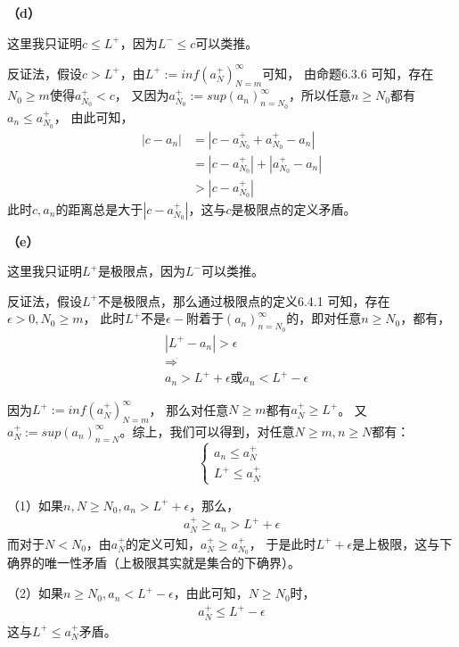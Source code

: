 \documentclass{article}
\theoremstyle{mystyle}
\begin{document}
\textbf{（d）}

这里我只证明$c \leq L^+$，因为$L^- \leq c$可以类推。

反证法，假设$c > L^+$，由$L^+ := inf(a_N^+)_{N=m}^\infty$可知，
由命题6.3.6 可知，存在$N_0 \geq m$使得$a_{N_0}^+ < c$，
又因为$a_{N_0}^+ := sup(a_n)_{n=N_0}^\infty$，所以任意$n \geq N_0$都有$a_n \leq a_{N_0}^+$，
由此可知，
\begin{align*}
  |c - a_n| & = |c - a_{N_0}^+ + a_{N_0}^+ - a_n|   \\
            & = |c - a_{N_0}^+| + |a_{N_0}^+ - a_n| \\
            & > |c - a_{N_0}^+|
\end{align*}
此时$c,a_n$的距离总是大于$|c - a_{N_0}^+|$，这与$c$是极限点的定义矛盾。

\textbf{（e）}

这里我只证明$L^+$是极限点，因为$L^-$可以类推。

反证法，假设$L^+$不是极限点，那么通过极限点的定义6.4.1 可知，存在$\epsilon > 0, N_0 \geq m$，
此时$L^+$不是$\epsilon -$附着于$(a_n)_{n=N_0}^\infty$的，即对任意$n \geq N_0$，都有，
\begin{align*}
   & |L^+ - a_n| > \epsilon                             \\
   & \Rightarrow                                        \\
   & a_n > L^+ + \epsilon \text{或} a_n < L^+ - \epsilon
\end{align*}

因为$L^+ := inf(a_N^+)_{N=m}^\infty$，
那么对任意$N \geq m$都有$a_N^+ \geq L^+$。
又$a_N^+ := sup(a_n)_{n=N}^\infty$。综上，我们可以得到，对任意$N \geq m, n \geq N$都有：
\begin{equation}
  \begin{cases*}
    a_n \leq a_N^+ \\
    L^+ \leq a_N^+
  \end{cases*}
\end{equation}

（1）如果$n, N \geq N_0, a_n > L^+ + \epsilon$，那么，
\begin{align*}
  a_N^+ \geq a_n > L^+ + \epsilon
\end{align*}
而对于$N < N_0$，由$a_N^+$的定义可知，$a_N^+ \geq a_{N_0}^+$，
于是此时$L^+ + \epsilon$是上极限，这与下确界的唯一性矛盾（上极限其实就是集合的下确界）。

（2）如果$n \geq N_0, a_n < L^+ - \epsilon$，由此可知，$N \geq N_0$时，
\begin{align*}
  a_N^+ \leq L^+ - \epsilon
\end{align*}
这与$L^+ \leq a_N^+$矛盾。
\end{document}
